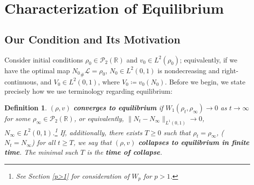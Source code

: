 \documentclass[11pt]{article}
\newtheorem{lemma}[thm]{Lemma}
\newtheorem{defn}[thm]{Definition}
\numberwithin{equation}{section}
\begin{document}
\section{Characterization of Equilibrium}
    \subsection{Our Condition and Its Motivation}



    
    Consider initial conditions $\rho_0\in\mathcal{P}_2(\mathbb{R})$ and $v_0\in L^2(\rho_0)$; equivalently, if we have the optimal map ${N_0}_\#\mathcal{L}=\rho_0$, $N_0\in L^2(0,1)$ is nondecreasing and right-continuous, and $V_0\in L^2(0,1)$, where $V_0\coloneq v_0(N_0)$. Before we begin, we state precisely how we use terminology regarding equilibrium: 
    \begin{defn}\label{equilibrium-def}
        $(\rho,v)$ \textbf{converges to equilibrium} if \mbox{$W_1(\rho_t, \rho_\infty)\to0$} as $t\to\infty$ for some \mbox{$\rho_\infty\in \mathcal{P}_2(\mathbb{R})$}, or equivalently, \mbox{$\|N_t-N_\infty\|_{L^1(0,1)}\to0$}, $N_\infty\in L^2(0,1)$.\footnote{See Section \ref{p>1} for consideration of $W_p$ for $p>1$.} If, additionally, there exists $T\geq0$ such that $\rho_t=\rho_\infty$, ($N_t=N_\infty$) for all $t\geq T$, we say that $(\rho,v)$ \textbf{collapses to equilibrium in finite time}. The minimal such $T$ is the \textbf{time of collapse}.
\end{defn}
    
\end{document}
